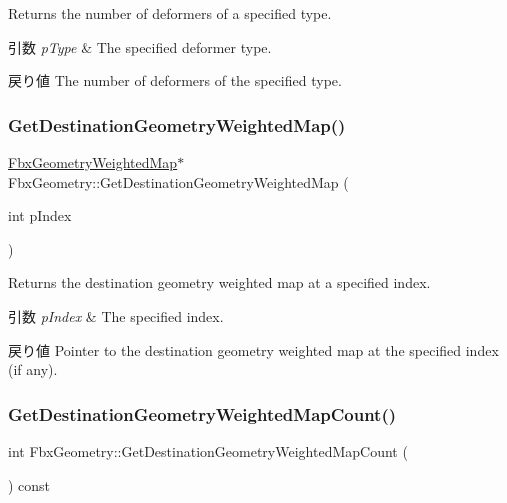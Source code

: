 Returns the number of deformers of a specified type. 
\begin{DoxyParams}{引数}
{\em p\+Type} & The specified deformer type. \\
\hline
\end{DoxyParams}
\begin{DoxyReturn}{戻り値}
The number of deformers of the specified type. 
\end{DoxyReturn}
\mbox{\label{class_fbx_geometry_a377769a99e12dc765ac9ea49282ad1bf}} 
\subsubsection{\texorpdfstring{Get\+Destination\+Geometry\+Weighted\+Map()}{GetDestinationGeometryWeightedMap()}}
{\footnotesize\ttfamily \hyperlink{class_fbx_geometry_weighted_map}{Fbx\+Geometry\+Weighted\+Map}$\ast$ Fbx\+Geometry\+::\+Get\+Destination\+Geometry\+Weighted\+Map (\begin{DoxyParamCaption}\item[{int}]{p\+Index }\end{DoxyParamCaption})}

Returns the destination geometry weighted map at a specified index. 
\begin{DoxyParams}{引数}
{\em p\+Index} & The specified index. \\
\hline
\end{DoxyParams}
\begin{DoxyReturn}{戻り値}
Pointer to the destination geometry weighted map at the specified index (if any). 
\end{DoxyReturn}
\mbox{\label{class_fbx_geometry_a7bebc9194083c5bacf77389b98ff906f}} 
\subsubsection{\texorpdfstring{Get\+Destination\+Geometry\+Weighted\+Map\+Count()}{GetDestinationGeometryWeightedMapCount()}}
{\footnotesize\ttfamily int Fbx\+Geometry\+::\+Get\+Destination\+Geometry\+Weighted\+Map\+Count (\begin{DoxyParamCaption}{ }\end{DoxyParamCaption}) const}

